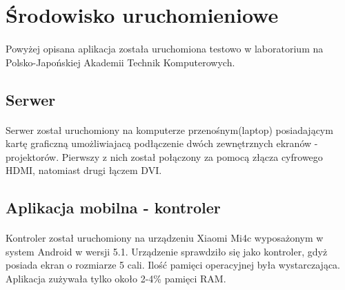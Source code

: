 \section{Środowisko uruchomieniowe}
\paragraph{}
Powyżej opisana aplikacja została uruchomiona testowo w laboratorium na Polsko-Japońskiej Akademii Technik Komputerowych.

\subsection{Serwer}
\paragraph{}
Serwer został uruchomiony na komputerze przenośnym(laptop) posiadającym kartę graficzną umożliwiajacą podłączenie dwóch zewnętrznych ekranów - projektorów. Pierwszy z nich został połączony za pomocą złącza cyfrowego HDMI, natomiast drugi łączem DVI.
\subsection{Aplikacja mobilna - kontroler}
\paragraph{}
Kontroler został uruchomiony na urządzeniu Xiaomi Mi4c wyposażonym w system Android w wersji 5.1. Urządzenie sprawdziło się jako kontroler, gdyż posiada ekran o rozmiarze 5 cali. Ilość pamięci operacyjnej była wystarczająca. Aplikacja zużywała tylko około 2-4\% pamięci RAM. 